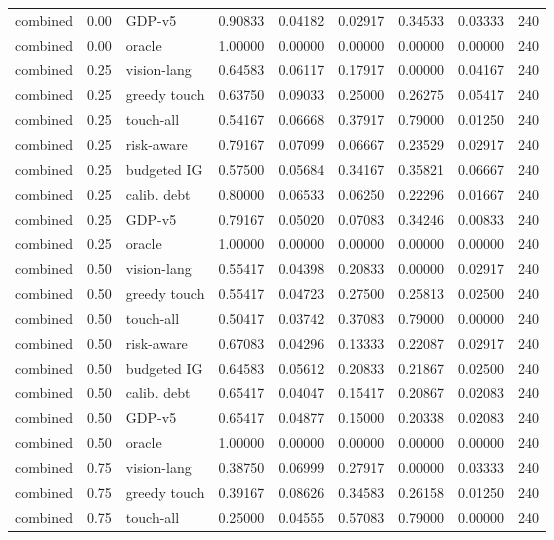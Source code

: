 \documentclass{article}
\begin{document}
\begin{center}
\begin{longtable}{lllllllll}
combined & 0.00 & GDP-v5 & 0.90833 & 0.04182 & 0.02917 & 0.34533 & 0.03333 & 240 \\
combined & 0.00 & oracle & 1.00000 & 0.00000 & 0.00000 & 0.00000 & 0.00000 & 240 \\
combined & 0.25 & vision-lang & 0.64583 & 0.06117 & 0.17917 & 0.00000 & 0.04167 & 240 \\
combined & 0.25 & greedy touch & 0.63750 & 0.09033 & 0.25000 & 0.26275 & 0.05417 & 240 \\
combined & 0.25 & touch-all & 0.54167 & 0.06668 & 0.37917 & 0.79000 & 0.01250 & 240 \\
combined & 0.25 & risk-aware & 0.79167 & 0.07099 & 0.06667 & 0.23529 & 0.02917 & 240 \\
combined & 0.25 & budgeted IG & 0.57500 & 0.05684 & 0.34167 & 0.35821 & 0.06667 & 240 \\
combined & 0.25 & calib. debt & 0.80000 & 0.06533 & 0.06250 & 0.22296 & 0.01667 & 240 \\
combined & 0.25 & GDP-v5 & 0.79167 & 0.05020 & 0.07083 & 0.34246 & 0.00833 & 240 \\
combined & 0.25 & oracle & 1.00000 & 0.00000 & 0.00000 & 0.00000 & 0.00000 & 240 \\
combined & 0.50 & vision-lang & 0.55417 & 0.04398 & 0.20833 & 0.00000 & 0.02917 & 240 \\
combined & 0.50 & greedy touch & 0.55417 & 0.04723 & 0.27500 & 0.25813 & 0.02500 & 240 \\
combined & 0.50 & touch-all & 0.50417 & 0.03742 & 0.37083 & 0.79000 & 0.00000 & 240 \\
combined & 0.50 & risk-aware & 0.67083 & 0.04296 & 0.13333 & 0.22087 & 0.02917 & 240 \\
combined & 0.50 & budgeted IG & 0.64583 & 0.05612 & 0.20833 & 0.21867 & 0.02500 & 240 \\
combined & 0.50 & calib. debt & 0.65417 & 0.04047 & 0.15417 & 0.20867 & 0.02083 & 240 \\
combined & 0.50 & GDP-v5 & 0.65417 & 0.04877 & 0.15000 & 0.20338 & 0.02083 & 240 \\
combined & 0.50 & oracle & 1.00000 & 0.00000 & 0.00000 & 0.00000 & 0.00000 & 240 \\
combined & 0.75 & vision-lang & 0.38750 & 0.06999 & 0.27917 & 0.00000 & 0.03333 & 240 \\
combined & 0.75 & greedy touch & 0.39167 & 0.08626 & 0.34583 & 0.26158 & 0.01250 & 240 \\
combined & 0.75 & touch-all & 0.25000 & 0.04555 & 0.57083 & 0.79000 & 0.00000 & 240 \\

\end{longtable}
\end{center}
\end{document}

